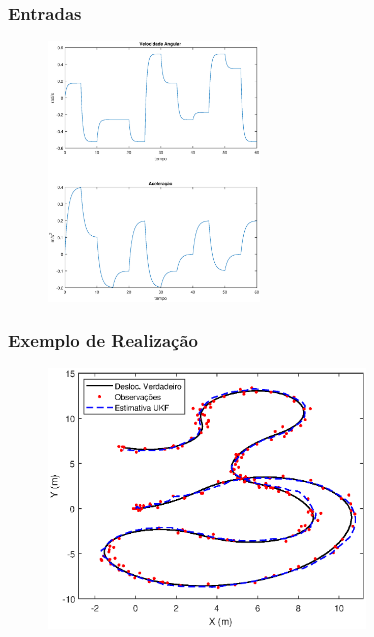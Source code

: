 \documentclass{beamer}
\renewcommand{\(}{\left(}
\renewcommand{\)}{\right)}
\renewcommand{\[}{\left[}
\renewcommand{\]}{\right]}
\begin{document}
\begin{frame}
\frametitle{Entradas}

	\begin{figure}
		\centering
		\includegraphics[width=0.5\textwidth]{images/entradas.eps}
	\end{figure}

\end{frame}

\begin{frame}
\frametitle{Exemplo de Realização}

\begin{figure}
	\centering
	\includegraphics[width=0.75\textwidth]{images/exemplo_03_30db_desloc.eps}
\end{figure}

\end{frame}


\end{document}
